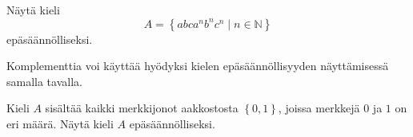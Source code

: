 \documentclass[a4paper,11pt]{article}
\theoremstyle{definition}
\newcommand{\set}[1]{{\left\{ #1 \right\}}}
\newcommand{\Nat}{\mathbb{N}}
\begin{document}
\begin{exercise}
    Näytä kieli
    \begin{equation*}
        A = \set{abca^nb^nc^n \mid n \in \Nat}
    \end{equation*}
    epäsäännölliseksi.
\end{exercise}

Komplementtia voi käyttää hyödyksi kielen epä\-sään\-nöl\-li\-syy\-den näyttämisessä
samalla tavalla.

\begin{exercise}
    Kieli $A$ sisältää kaikki merkkijonot aakkostosta $\set{0,1}$, joissa merkkejä $0$ ja
    $1$ on eri määrä. Näytä kieli $A$ epäsäännölliseksi.
\end{exercise}
\end{document}
